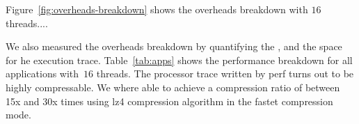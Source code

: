 Figure~\ref{fig:overheads-breakdown} shows the overheads breakdown with $16$ threads....





We also measured the overheads breakdown by
quantifying the , and the space for he execution trace. Table~\ref{tab:apps} shows the performance breakdown for all applications  with~$16$ threads.
The processor trace written by perf turns out to be highly compressable. We
where able to achieve a compression ratio of between 15x and 30x times using lz4
compression algorithm in the fastet compression mode.


